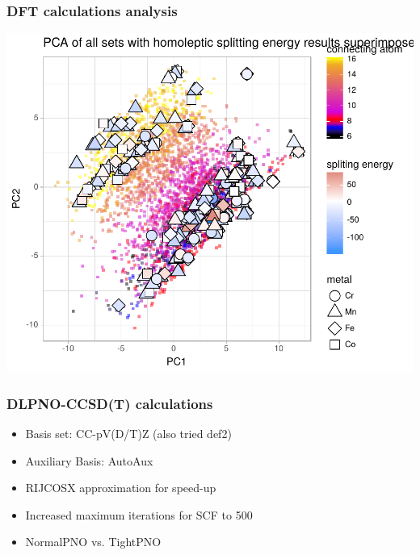 \documentclass[xcolor=dvipsnames]{beamer}
\begin{document}
\begin{frame}
\frametitle{DFT calculations analysis}
\centering
\includegraphics[width=0.6\linewidth]{img/pca_rf39_SplitIntoSU_splitene_metal_cai.pdf}
\centering
\end{frame}

\begin{frame}
\frametitle{DLPNO-CCSD(T) calculations}
\begin{itemize}
	\item Basis set: CC-pV(D/T)Z (also tried def2)
	\item Auxiliary Basis: AutoAux
	\item RIJCOSX approximation for speed-up
	\item Increased maximum iterations for SCF to 500 
	\item NormalPNO vs. TightPNO
\end{itemize}
\end{frame}
\end{document}
